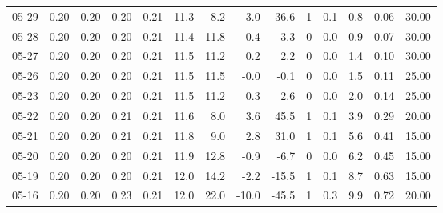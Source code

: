 \begin{threeparttable}
{\begin{tabular}{lrrrrrrrrrrrrr}
  05-29 &          0.20 &          0.20 &          0.20 &        0.21 &                11.3 &                 8.2 &        3.0 &         36.6 &              1 &                 0.1 &              0.8 &            0.06 &                  30.00 \\
  05-28 &          0.20 &          0.20 &          0.20 &        0.21 &                11.4 &                11.8 &       -0.4 &         -3.3 &              0 &                 0.0 &              0.9 &            0.07 &                  30.00 \\
  05-27 &          0.20 &          0.20 &          0.20 &        0.21 &                11.5 &                11.2 &        0.2 &          2.2 &              0 &                 0.0 &              1.4 &            0.10 &                  30.00 \\
  05-26 &          0.20 &          0.20 &          0.20 &        0.21 &                11.5 &                11.5 &       -0.0 &         -0.1 &              0 &                 0.0 &              1.5 &            0.11 &                  25.00 \\
  05-23 &          0.20 &          0.20 &          0.20 &        0.21 &                11.5 &                11.2 &        0.3 &          2.6 &              0 &                 0.0 &              2.0 &            0.14 &                  25.00 \\
  05-22 &          0.20 &          0.20 &          0.21 &        0.21 &                11.6 &                 8.0 &        3.6 &         45.5 &              1 &                 0.1 &              3.9 &            0.29 &                  20.00 \\
  05-21 &          0.20 &          0.20 &          0.21 &        0.21 &                11.8 &                 9.0 &        2.8 &         31.0 &              1 &                 0.1 &              5.6 &            0.41 &                  15.00 \\
  05-20 &          0.20 &          0.20 &          0.20 &        0.21 &                11.9 &                12.8 &       -0.9 &         -6.7 &              0 &                 0.0 &              6.2 &            0.45 &                  15.00 \\
  05-19 &          0.20 &          0.20 &          0.20 &        0.21 &                12.0 &                14.2 &       -2.2 &        -15.5 &              1 &                 0.1 &              8.7 &            0.63 &                  15.00 \\
  05-16 &          0.20 &          0.20 &          0.23 &        0.21 &                12.0 &                22.0 &      -10.0 &        -45.5 &              1 &                 0.3 &              9.9 &            0.72 &                  20.00 \\

\end{tabular}}
\end{threeparttable}
